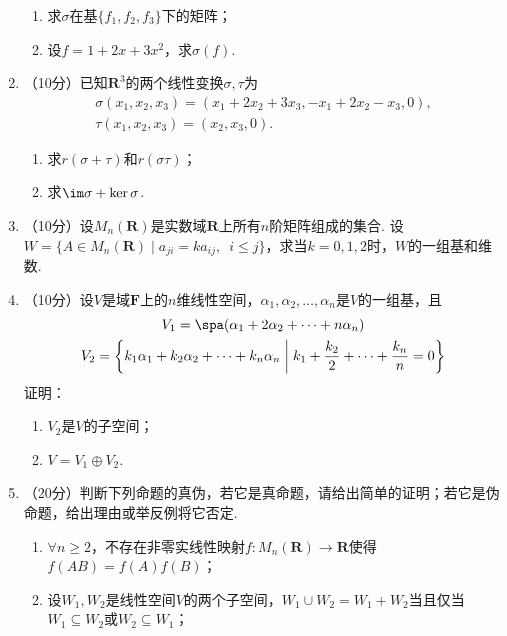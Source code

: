 \begin{enumerate}
\begin{enumerate}
        \item 求$\sigma$在基$\{f_1,f_2,f_3\}$下的矩阵；

        \item 设$f=1+2x+3x^2$，求$\sigma(f)$.
    \end{enumerate}
    \item （10分）已知$\mathbf{R}^3$的两个线性变换$\sigma,\tau$为
    \begin{gather*}
           \sigma(x_1,x_2,x_3)=(x_1+2x_2+3x_3,-x_1+2x_2-x_3,0), \\
           \tau(x_1,x_2,x_3)=(x_2,x_3,0).
    \end{gather*}
    \begin{enumerate}
        \item 求$r(\sigma+\tau)$和$r(\sigma\tau)$；

        \item 求$\im\sigma+\ker\sigma$.
    \end{enumerate}
    \item （10分）设$M_n(\mathbf{R})$是实数域$\mathbf{R}$上所有$n$阶矩阵组成的集合. 设$W=\{A\in M_n(\mathbf{R})\mid a_{ji}=ka_{ij},\enspace i\leqslant j\}$，求当$k=0,1,2$时，$W$的一组基和维数.

    \item （10分）设$V$是域$\mathbf{F}$上的$n$维线性空间，$\alpha_1,\alpha_2,\ldots,\alpha_n$是$V$的一组基，且
    \begin{gather*}
        V_1=\spa(\alpha_1+2\alpha_2+\cdots+n\alpha_n) \\
        V_2=\left\{k_1\alpha_1+k_2\alpha_2+\cdots+k_n\alpha_n \;\middle|\; k_1+\frac{k_2}{2}+\cdots+\frac{k_n}{n}=0\right\}
    \end{gather*}
    证明：
    \begin{enumerate}
        \item $V_2$是$V$的子空间；

        \item $V=V_1\oplus V_2$.
    \end{enumerate}
    \item （20分）判断下列命题的真伪，若它是真命题，请给出简单的证明；若它是伪命题，给出理由或举反例将它否定.
    \begin{enumerate}
        \item $\forall n\geqslant 2$，不存在非零实线性映射$f\colon M_n(\mathbf{R})\to\mathbf{R}$使得$f(AB)=f(A)f(B)$；

        \item 设$W_1,W_2$是线性空间$V$的两个子空间，$W_1\cup W_2=W_1+W_2$当且仅当$W_1\subseteq W_2$或$W_2\subseteq W_1$；


\end{enumerate}
\end{enumerate}
